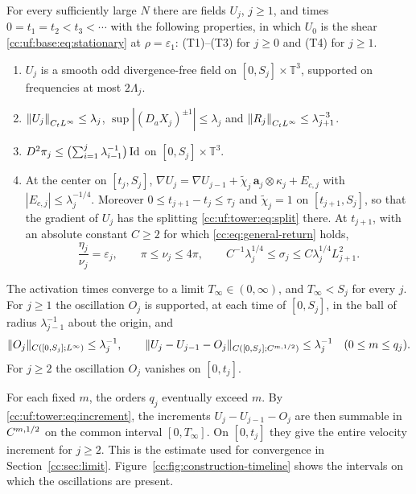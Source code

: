 \begin{theorem}\label{cc:uf:tower:thm:finite}
For every sufficiently large $N$ there are fields $U_j$, $j\ge1$, and
times $0=t_1=t_2<t_3<\cdots$ with the following properties, in which
$U_0$ is the shear \eqref{cc:uf:base:eq:stationary} at $\rho=\varepsilon_1$:
\textup{(T1)}--\textup{(T3)} for $j\ge0$ and \textup{(T4)} for $j\ge1$.
\begin{enumerate}[label=(T\arabic*),leftmargin=*]
\item $U_j$ is a smooth odd divergence-free field on
$[0,S_j]\times\mathbb T^3$, supported on frequencies at most $2\Lambda_j$.
\item $\left\lVert U_j\right\rVert_{C_tL^\infty}\le\lambda_j$,
$\sup|(D_aX_j)^{\pm1}|\le\lambda_j$ and
$\left\lVert R_j\right\rVert_{C_tL^\infty}\le\lambda_{j+1}^{-3}$.
\item $D^2\pi_j\le\bigl(\sum_{i=1}^j\lambda_{i-1}^{-1}\bigr)\operatorname{Id}$ on
$[0,S_j]\times\mathbb T^3$.
\item At the center on $[t_j,S_j]$,
$\nabla U_j=\nabla U_{j-1}
+\widetilde\chi_j\,\mathbf a_j\otimes\kappa_j+E_{c,j}$ with
$|E_{c,j}|\le\lambda_j^{-1/4}$. Moreover
$0\le t_{j+1}-t_j\le\tau_j$ and $\widetilde\chi_j=1$ on
$[t_{j+1},S_j]$, so that the gradient of $U_j$ has the splitting
\eqref{cc:uf:tower:eq:split} there. At $t_{j+1}$, with an absolute
constant $C\ge2$ for which \eqref{cc:eq:general-return} holds,
\begin{equation}\label{cc:uf:tower:eq:late-values}
 \frac{\eta_j}{\nu_j}=\varepsilon_j,\qquad
 \pi\le\nu_j\le4\pi,\qquad
 C^{-1}\lambda_j^{1/4}\le\sigma_j\le C\lambda_j^{1/4}L_{j+1}^2 .
\end{equation}
\end{enumerate}
The activation times converge to a limit
$T_\infty\in(0,\infty)$, and $T_\infty<S_j$ for every $j$. For $j\ge1$
the oscillation $O_j$ is supported, at each time of $[0,S_j]$, in the
ball of radius $\lambda_{j-1}^{-1}$ about the origin, and
\begin{equation}\label{cc:uf:tower:eq:increment}
 \|O_j\|_{C([0,S_j];L^\infty)}\le\lambda_j^{-1},\qquad
 \|U_j-U_{j-1}-O_j\|_{C([0,S_j];C^{m,1/2})}\le\lambda_j^{-1}
 \quad(0\le m\le q_j).
\end{equation}
For $j\ge2$ the oscillation $O_j$ vanishes on $[0,t_j]$.
\end{theorem}

For each fixed $m$, the orders $q_j$ eventually exceed $m$. By
\eqref{cc:uf:tower:eq:increment}, the increments $U_j-U_{j-1}-O_j$
are then summable in $C^{m,1/2}$ on the common interval $[0,T_\infty]$.
On $[0,t_j]$ they give the entire velocity increment for $j\ge2$.
This is the estimate used for convergence in
Section~\ref{cc:sec:limit}. Figure~\ref{cc:fig:construction-timeline}
shows the intervals on which the oscillations are present.

